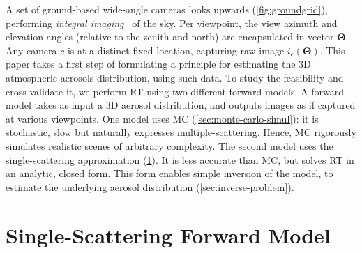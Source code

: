 \documentclass[10pt,letterpaper]{article}
\begin{document}
A set of ground-based wide-angle cameras looks upwards
(\cref{fig:groundgrid}), performing {\em integral
  imaging}~\cite{Hong2004} of the sky. Per viewpoint, the view azimuth
and elevation angles (relative to the zenith and north) are
encapsulated in vector ${\bm{\Theta}}$. Any camera $c$ is at a
distinct fixed location, capturing raw image
$i_c({\bm{\Theta}})$. This paper takes a first step of formulating a
principle for estimating the 3D atmospheric aerosols distribution,
using such data. To study the feasibility and cross validate it, we
perform RT using two different forward models. A forward model takes
as input a 3D aerosol distribution, and outputs images as if captured
at various viewpoints.  One model uses MC
(\cref{sec:monte-carlo-simul}): it is stochastic, slow but naturally
expresses multiple-scattering. Hence, MC rigorously simulates
realistic scenes of arbitrary complexity.
The second model uses the single-scattering approximation
(\cref{sec:single-scatt-model}). It is less accurate than MC, but
solves RT in an analytic, closed form. This form enables simple
inversion of the model, to estimate the underlying aerosol
distribution (\cref{sec:inverse-problem}).


\section{Single-Scattering Forward Model}
\label{sec:single-scatt-model}
\end{document}
